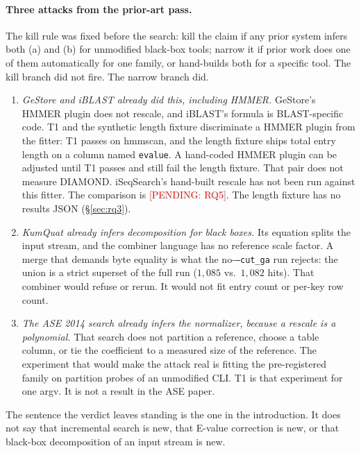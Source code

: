 \documentclass[letterpaper,twocolumn,10pt]{article}
\newcommand{\pending}[1]{\textcolor{red}{[PENDING: #1]}}
\begin{document}
\paragraph{Three attacks from the prior-art pass.}
The kill rule was fixed before the search: kill the claim if any prior system infers both (a) and (b) for unmodified black-box tools; narrow it if prior work does one of them automatically for one family, or hand-builds both for a specific tool.
The kill branch did not fire.
The narrow branch did.

\begin{enumerate}
  \item \textit{GeStore and iBLAST already did this, including HMMER.}
  GeStore's HMMER plugin does not rescale, and iBLAST's formula is BLAST-specific code.
  T1 and the synthetic length fixture discriminate a HMMER plugin from the fitter: T1 passes on hmmscan, and the length fixture ships total entry length on a column named \texttt{evalue}.
  A hand-coded HMMER plugin can be adjusted until T1 passes and still fail the length fixture.
  That pair does not measure DIAMOND.
  iSeqSearch's hand-built rescale has not been run against this fitter.
  The comparison is
  \pending{RQ5}.
  The length fixture has no results JSON (\S\ref{sec:rq3}).
  \item \textit{KumQuat already infers decomposition for black boxes.}
  Its equation splits the input stream, and the combiner language has no reference scale factor.
  A merge that demands byte equality is what the no-\texttt{--cut\_ga} run rejects: the union is a strict superset of the full run
  ($1{,}085$ vs.\ $1{,}082$ hits).
  That combiner would refuse or rerun.
  It would not fit entry count or per-key row count.
  \item \textit{The ASE 2014 search already infers the normalizer, because a rescale is a polynomial.}
  That search does not partition a reference, choose a table column, or tie the coefficient to a measured size of the reference.
  The experiment that would make the attack real is fitting the pre-registered family on partition probes of an unmodified CLI.
  T1 is that experiment for one argv.
  It is not a result in the ASE paper.
\end{enumerate}

The sentence the verdict leaves standing is the one in the introduction.
It does not say that incremental search is new, that E-value correction is new, or that black-box decomposition of an input stream is new.
\end{document}
